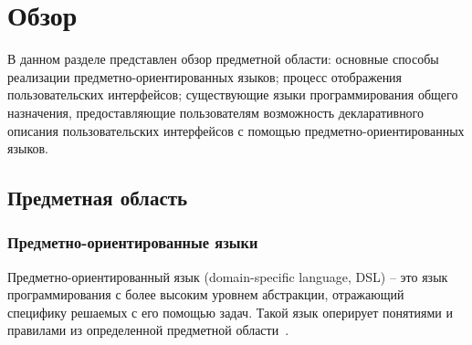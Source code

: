 \section{Обзор}
В данном разделе представлен обзор предметной области:
основные способы реализации предметно-ориентированных языков; 
процесс отображения пользовательских интерфейсов;
существующие языки программирования общего назначения, предоставляющие
пользователям возможность декларативного описания пользовательских
интерфейсов с помощью предметно-ориентированных языков.

\subsection{Предметная область}
\subsubsection{Предметно-ориентированные языки}
Предметно-ориентированный язык (domain-specific language, DSL) -- это язык
программирования с более высоким уровнем абстракции, отражающий специфику
решаемых с его помощью задач.
Такой язык оперирует понятиями и правилами из определенной предметной
области~\cite{book-of-dsls}.

